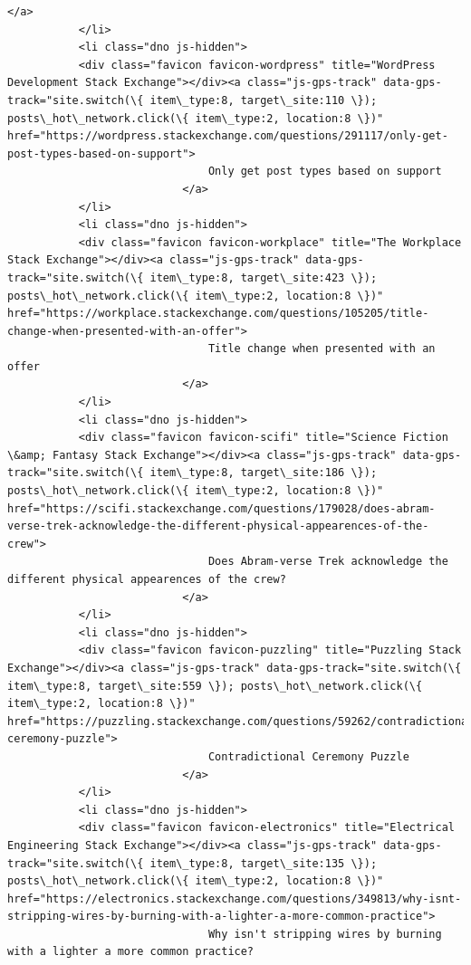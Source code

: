 \documentclass[11pt]{article}
\begin{document}
\begin{Verbatim}[commandchars=\\\{\}]
                           </a>
           </li>
           <li class="dno js-hidden">
           <div class="favicon favicon-wordpress" title="WordPress Development Stack Exchange"></div><a class="js-gps-track" data-gps-track="site.switch(\{ item\_type:8, target\_site:110 \}); posts\_hot\_network.click(\{ item\_type:2, location:8 \})" href="https://wordpress.stackexchange.com/questions/291117/only-get-post-types-based-on-support">
                               Only get post types based on support
                           </a>
           </li>
           <li class="dno js-hidden">
           <div class="favicon favicon-workplace" title="The Workplace Stack Exchange"></div><a class="js-gps-track" data-gps-track="site.switch(\{ item\_type:8, target\_site:423 \}); posts\_hot\_network.click(\{ item\_type:2, location:8 \})" href="https://workplace.stackexchange.com/questions/105205/title-change-when-presented-with-an-offer">
                               Title change when presented with an offer
                           </a>
           </li>
           <li class="dno js-hidden">
           <div class="favicon favicon-scifi" title="Science Fiction \&amp; Fantasy Stack Exchange"></div><a class="js-gps-track" data-gps-track="site.switch(\{ item\_type:8, target\_site:186 \}); posts\_hot\_network.click(\{ item\_type:2, location:8 \})" href="https://scifi.stackexchange.com/questions/179028/does-abram-verse-trek-acknowledge-the-different-physical-appearences-of-the-crew">
                               Does Abram-verse Trek acknowledge the different physical appearences of the crew?
                           </a>
           </li>
           <li class="dno js-hidden">
           <div class="favicon favicon-puzzling" title="Puzzling Stack Exchange"></div><a class="js-gps-track" data-gps-track="site.switch(\{ item\_type:8, target\_site:559 \}); posts\_hot\_network.click(\{ item\_type:2, location:8 \})" href="https://puzzling.stackexchange.com/questions/59262/contradictional-ceremony-puzzle">
                               Contradictional Ceremony Puzzle
                           </a>
           </li>
           <li class="dno js-hidden">
           <div class="favicon favicon-electronics" title="Electrical Engineering Stack Exchange"></div><a class="js-gps-track" data-gps-track="site.switch(\{ item\_type:8, target\_site:135 \}); posts\_hot\_network.click(\{ item\_type:2, location:8 \})" href="https://electronics.stackexchange.com/questions/349813/why-isnt-stripping-wires-by-burning-with-a-lighter-a-more-common-practice">
                               Why isn't stripping wires by burning with a lighter a more common practice?

\end{Verbatim}
\end{document}

